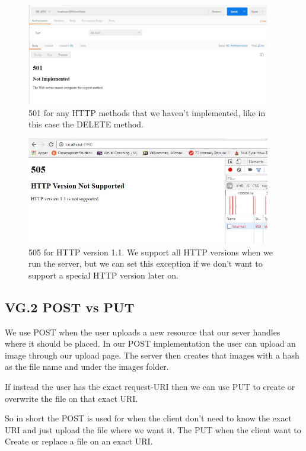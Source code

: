 \documentclass[a4paper,12pt]{article}
\numberwithin{figure}{section}
\begin{document}
\begin{figure}[h!]
	\centering
	\label{501}
	\includegraphics[width=0.95\textwidth,keepaspectratio]{img/501.jpg} 
	\caption{501 for any HTTP methods that we haven't implemented, like in this case the DELETE method.}
\end{figure}

\begin{figure}[h!]
	\centering
	\label{505}
	\includegraphics[width=0.95\textwidth,keepaspectratio]{img/505.jpg} 
	\caption{505 for HTTP version 1.1. We support all HTTP versions when we run the server, but we can set this exception if we don't want to support a special HTTP version later on.}
\end{figure}

\newpage
\subsection{VG.2 POST vs PUT}

We use POST when the user uploads a new resource that our sever handles where it should be placed. In our POST implementation the user can upload an image through our upload page. The server then creates that images with a hash as the file name and under the images folder.  

If instead the user has the exact request-URI then we can use PUT to create or overwrite the file on that exact URI. 

So in short the POST is used for when the client don't need to know the exact URI and just upload the file where we want it. The PUT when the client want to Create or replace a file on an exact URI.
\end{document}
